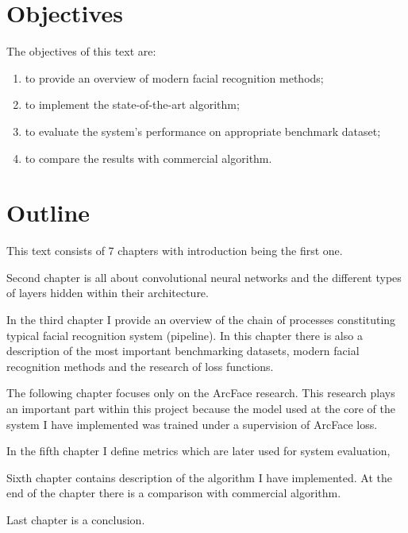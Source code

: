 \section{Objectives}\label{sec:objectives}
The objectives of this text are:
\begin{enumerate}
    \item to provide an overview of modern facial recognition methods;
    \item to implement the state-of-the-art algorithm;
    \item to evaluate the system's performance on appropriate benchmark dataset;
    \item to compare the results with commercial algorithm.
\end{enumerate}

\section{Outline}\label{sec:outline}
This text consists of 7 chapters with introduction being the first one.

Second chapter is all about convolutional neural networks and the different types of layers hidden within their
architecture.

In the third chapter I provide an overview of the chain of processes constituting typical facial recognition system
(pipeline).
In this chapter there is also a description of the most important benchmarking datasets, modern facial recognition
methods and the research of loss functions.

The following chapter focuses only on the ArcFace research.
This research plays an important part within this project because the model used at the core of the system I have
implemented was trained under a supervision of ArcFace loss.

In the fifth chapter I define metrics which are later used for system evaluation,

Sixth chapter contains description of the algorithm I have implemented.
At the end of the chapter there is a comparison with commercial algorithm.

Last chapter is a conclusion.